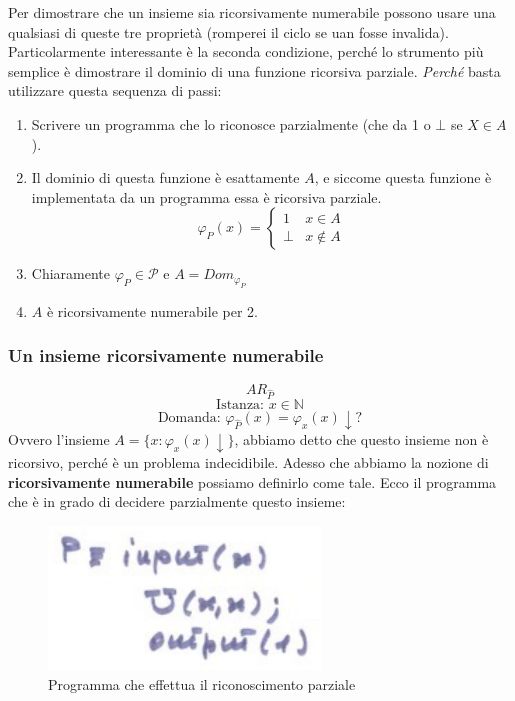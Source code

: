 \documentclass{article}
\begin{document}
Per dimostrare che un insieme sia ricorsivamente numerabile possono usare una qualsiasi
di queste tre proprietà (romperei il ciclo se uan fosse invalida). Particolarmente
interessante è la seconda condizione, perché lo strumento più semplice è dimostrare il dominio
di una funzione ricorsiva parziale. \textit{Perché} basta utilizzare questa sequenza di passi:
\begin{enumerate}
    \item Scrivere un programma che lo riconosce parzialmente (che da 1 o $\bot$ se $X\in A$).
    \item Il dominio di questa funzione è esattamente $A$, e siccome questa funzione è implementata
    da un programma essa è ricorsiva parziale.
    \[
        \varphi_P(x)=
        \begin{cases}
            1 & x\in A\\
            \bot & x\notin A
        \end{cases}
    \]
    \item Chiaramente $\varphi_P\in\mathcal{P}$ e $A=Dom_{\varphi_P}$
    \item $A$ è ricorsivamente numerabile per 2.
\end{enumerate}

\subsubsection{Un insieme ricorsivamente numerabile}
$$AR_{\hat{P}}$$
$$\text{Istanza: }x\in\mathbb{N}$$
$$\text{Domanda: }\varphi_{\hat{P}}(x)=\varphi_x(x)\downarrow?$$
Ovvero l'insieme $A=\{x:\varphi_x(x)\downarrow\}$, abbiamo detto che questo insieme non è ricorsivo,
perché è un problema indecidibile. Adesso che abbiamo la nozione di \textbf{ricorsivamente numerabile}
possiamo definirlo come tale. Ecco il programma che è in grado di decidere parzialmente questo insieme:
\begin{figure}[H]
    \centering
    \includegraphics[]{images/interpuniv.png}
    \caption{Programma che effettua il riconoscimento parziale}
\end{figure}
\end{document}
